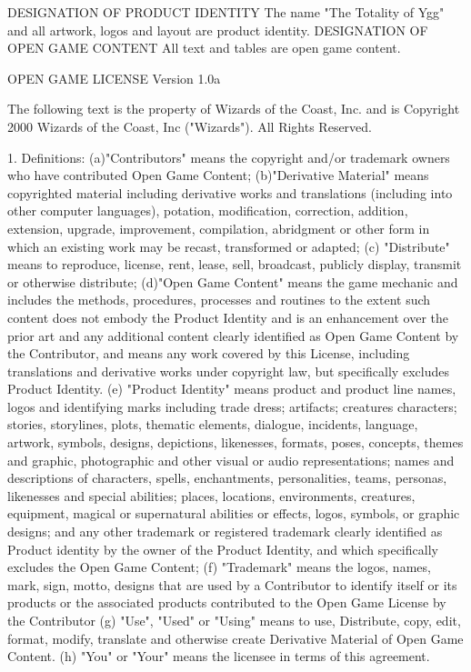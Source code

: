 \scriptsize{
DESIGNATION OF PRODUCT IDENTITY
The name "The Totality of Ygg" and all artwork, logos and layout are product identity. DESIGNATION OF OPEN GAME CONTENT All text and tables are open game content.

OPEN GAME LICENSE Version 1.0a

The following text is the property of Wizards of the Coast, Inc. and is Copyright 2000 Wizards of the Coast, Inc ("Wizards"). All Rights Reserved.

1. Definitions: (a)"Contributors" means the copyright and/or trademark owners who have contributed Open Game Content; (b)"Derivative Material" means copyrighted material including derivative works and translations (including into other computer languages), potation, modification, correction, addition, extension, upgrade, improvement, compilation, abridgment or other form in which an existing work may be recast, transformed or adapted; (c) "Distribute" means to reproduce, license, rent, lease, sell, broadcast, publicly display, transmit or otherwise distribute; (d)"Open Game Content" means the game mechanic and includes the methods, procedures, processes and routines to the extent such content does not embody the Product Identity and is an enhancement over the prior art and any additional content clearly identified as Open Game Content by the Contributor, and means any work covered by this License, including translations and derivative works under copyright law, but specifically excludes Product Identity. (e) "Product Identity" means product and product line names, logos and identifying marks including trade dress; artifacts; creatures characters; stories, storylines, plots, thematic elements, dialogue, incidents, language, artwork, symbols, designs, depictions, likenesses, formats, poses, concepts, themes and graphic, photographic and other visual or audio representations; names and descriptions of characters, spells, enchantments, personalities, teams, personas, likenesses and special abilities; places, locations, environments, creatures, equipment, magical or supernatural abilities or effects, logos, symbols, or graphic designs; and any other trademark or registered trademark clearly identified as Product identity by the owner of the Product Identity, and which specifically excludes the Open Game Content; (f) "Trademark" means the logos, names, mark, sign, motto, designs that are used by a Contributor to identify itself or its products or the associated products contributed to the Open Game License by the Contributor (g) "Use", "Used" or "Using" means to use, Distribute, copy, edit, format, modify, translate and otherwise create Derivative Material of Open Game Content. (h) "You" or "Your" means the licensee in terms of this agreement.
}
